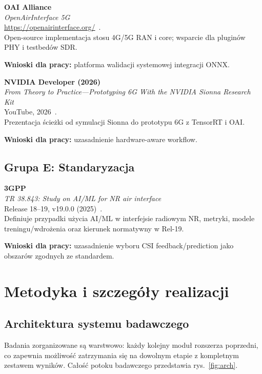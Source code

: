 \documentclass[12pt, a4paper]{article}
\newcommand{\bibentry}[4]{%
    \textbf{#1}\\
    \textit{#2}\\
    #3\\
    \vspace{0.3em}
    #4
    \vspace{0.8em}
}
\begin{document}
\bibentry{OAI Alliance}{OpenAirInterface 5G}{\url{https://openairinterface.org/}~\cite{oai}.}{%
    Open-source implementacja stosu 4G/5G RAN i core; wsparcie dla pluginów PHY i testbedów SDR.

    \textbf{Wnioski dla pracy:} platforma walidacji systemowej integracji ONNX.}

\bibentry{NVIDIA Developer (2026)}{From Theory to Practice---Prototyping 6G With the NVIDIA Sionna Research Kit}{YouTube, 2026~\cite{youtube-sionna}.}{%
    Prezentacja ścieżki od symulacji Sionna do prototypu 6G z TensorRT i OAI.

    \textbf{Wnioski dla pracy:} uzasadnienie hardware-aware workflow.}

\subsection{Grupa E: Standaryzacja}

\bibentry{3GPP}{TR 38.843: Study on AI/ML for NR air interface}{Release 18--19, v19.0.0 (2025)~\cite{3gpp-38843}.}{%
    Definiuje przypadki użycia AI/ML w interfejsie radiowym NR, metryki, modele treningu/wdrożenia oraz kierunek normatywny w Rel-19.

    \textbf{Wnioski dla pracy:} uzasadnienie wyboru CSI feedback/prediction jako obszarów zgodnych ze standardem.}

\section{Metodyka i szczegóły realizacji}
\label{sec:metodyka}

\subsection{Architektura systemu badawczego}

Badania zorganizowane są warstwowo: każdy kolejny moduł rozszerza poprzedni, co zapewnia możliwość zatrzymania się na dowolnym etapie z kompletnym zestawem wyników. Całość potoku badawczego przedstawia rys.~\ref{fig:arch}.
\end{document}
